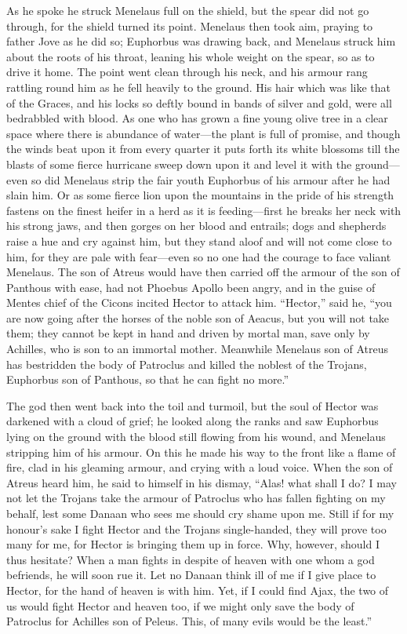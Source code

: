 As he spoke he struck Menelaus full on the shield, but the spear did not
go through, for the shield turned its point. Menelaus then took aim,
praying to father Jove as he did so; Euphorbus was drawing back, and
Menelaus struck him about the roots of his throat, leaning his whole
weight on the spear, so as to drive it home. The point went clean through
his neck, and his armour rang rattling round him as he fell heavily to the
ground. His hair which was like that of the Graces, and his locks so
deftly bound in bands of silver and gold, were all bedrabbled with blood.
As one who has grown a fine young olive tree in a clear space where there
is abundance of water—the plant is full of promise, and though the
winds beat upon it from every quarter it puts forth its white blossoms
till the blasts of some fierce hurricane sweep down upon it and level it
with the ground—even so did Menelaus strip the fair youth Euphorbus
of his armour after he had slain him. Or as some fierce lion upon the
mountains in the pride of his strength fastens on the finest heifer in a
herd as it is feeding—first he breaks her neck with his strong jaws,
and then gorges on her blood and entrails; dogs and shepherds raise a hue
and cry against him, but they stand aloof and will not come close to him,
for they are pale with fear—even so no one had the courage to face
valiant Menelaus. The son of Atreus would have then carried off the armour
of the son of Panthous with ease, had not Phoebus Apollo been angry, and
in the guise of Mentes chief of the Cicons incited Hector to attack him.
“Hector,” said he, “you are now going after the horses of the noble son of
Aeacus, but you will not take them; they cannot be kept in hand and driven
by mortal man, save only by Achilles, who is son to an immortal mother.
Meanwhile Menelaus son of Atreus has bestridden the body of Patroclus and
killed the noblest of the Trojans, Euphorbus son of Panthous, so that he
can fight no more.”

The god then went back into the toil and turmoil, but the soul of Hector
was darkened with a cloud of grief; he looked along the ranks and saw
Euphorbus lying on the ground with the blood still flowing from his wound,
and Menelaus stripping him of his armour. On this he made his way to the
front like a flame of fire, clad in his gleaming armour, and crying with a
loud voice. When the son of Atreus heard him, he said to himself in his
dismay, “Alas! what shall I do? I may not let the Trojans take the armour
of Patroclus who has fallen fighting on my behalf, lest some Danaan who
sees me should cry shame upon me. Still if for my honour’s sake I fight
Hector and the Trojans single-handed, they will prove too many for me, for
Hector is bringing them up in force. Why, however, should I thus hesitate?
When a man fights in despite of heaven with one whom a god befriends, he
will soon rue it. Let no Danaan think ill of me if I give place to Hector,
for the hand of heaven is with him. Yet, if I could find Ajax, the two of
us would fight Hector and heaven too, if we might only save the body of
Patroclus for Achilles son of Peleus. This, of many evils would be the
least.”

